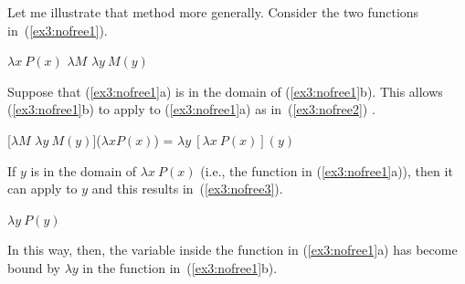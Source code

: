 Let me illustrate that method more generally. Consider the two functions in~(\ref{ex3:nofree1}).
\begin{exe}
	\raggedright
	\ex \label{ex3:nofree1} 
	\begin{xlist}
		\ex $\lambda x\ P(x)$
		\ex $\lambda M$ $\lambda y\ M(y)$ 
	\end{xlist}
\end{exe}
Suppose that (\ref{ex3:nofree1}a) is in the domain of (\ref{ex3:nofree1}b). This allows (\ref{ex3:nofree1}b) to apply to (\ref{ex3:nofree1}a) as in~(\ref{ex3:nofree2}) .
\begin{exe}
	\raggedright
	\ex \label{ex3:nofree2} 
	{}[$\lambda M$ $\lambda y\ M(y)$]($\lambda x P(x)$) = $\lambda y\ [\lambda x\ P(x)](y)$
\end{exe}
If $y$ is in the domain of $\lambda x\ P(x)$ (i.e., the function in (\ref{ex3:nofree1}a)), then it can apply to $y$ and this results in~(\ref{ex3:nofree3}).
\begin{exe}
	\raggedright
	\ex \label{ex3:nofree3} 
	$\lambda y\ P(y)$
\end{exe}
In this way, then, the variable inside the function in (\ref{ex3:nofree1}a) has become bound by $\lambda y$ in the function in~(\ref{ex3:nofree1}b).

